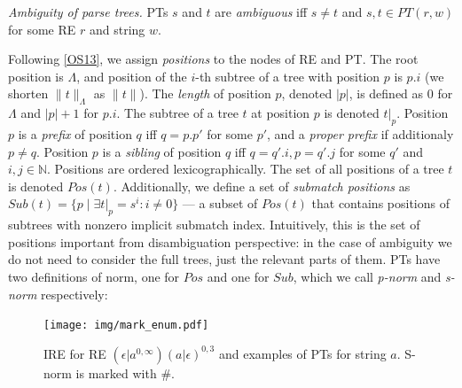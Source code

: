 \documentclass[AMA,STIX1COL]{WileyNJD-v2}
\newcommand{\XP}{\mathcal{P}}
\newcommand{\YN}{\mathbb{N}}
\begin{document}
    \begin{definition}\label{ambiguity_of_parse_trees}
    \emph{Ambiguity of parse trees.}
    PTs $s$ and $t$ are \emph{ambiguous} iff $s \neq t$ and $s, t \in PT(r, w)$ for some RE $r$ and string $w$.
    \end{definition}

Following \ref{OS13}, we assign \emph{positions} to the nodes of RE and PT.
The root position is $\Lambda$, and position of the $i$-th subtree of a tree with position $p$ is $p.i$
(we shorten $\|t\|_\Lambda$ as $\|t\|$).
The \emph{length} of position $p$, denoted $|p|$, is defined as $0$ for $\Lambda$ and $|p| + 1$ for $p.i$.
The subtree of a tree $t$ at position $p$ is denoted $t|_p$.
Position $p$ is a \emph{prefix} of position $q$ iff $q = p.p'$ for some $p'$,
and a \emph{proper prefix} if additionaly $p \neq q$.
Position $p$ is a \emph{sibling} of position $q$ iff $q = q'.i, p = q'.j$ for some $q'$ and $i,j \in \YN$.
Positions are ordered lexicographically.
The set of all positions of a tree $t$ is denoted $Pos(t)$.
Additionally, we define a set of \emph{submatch positions} as
$Sub(t) = \big\{ p \mid \exists t|_p = s^i : i \neq 0 \big\}$ ---
a subset of $Pos(t)$ that contains positions of subtrees with nonzero implicit submatch index.
Intuitively, this is the set of positions important from disambiguation perspective:
in the case of ambiguity we do not need to consider the full trees,
just the relevant parts of them.
%
PTs have two definitions of norm, one for $Pos$ and one for $Sub$,
which we call \emph{p-norm} and \emph{s-norm} respectively:

\begin{figure}\label{fig_mark_enum}
\texttt{[image: img/mark\_enum.pdf]}
\vspace{-2em}
\caption{
IRE for RE $(\epsilon|a^{0,\infty})(a|\epsilon)^{0,3}$
and examples of PTs for string $a$.
S-norm is marked with $\#$.
}
\end{figure}

\end{document}
